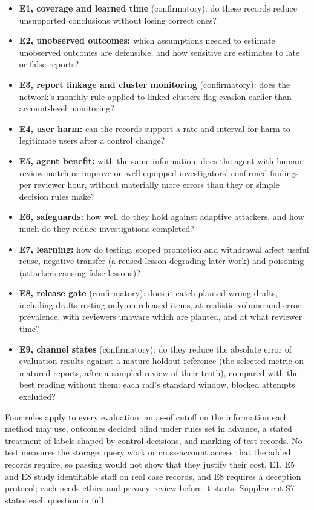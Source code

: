 \documentclass[acmlarge,review,anonymous,nonacm]{acmart}
\providecommand{\tightlist}{\setlength{\itemsep}{0pt}\setlength{\parskip}{0pt}}
\begin{document}
\begin{itemize}
\tightlist
\item
  \textbf{E1, coverage and learned time} (confirmatory): do these
  records reduce unsupported conclusions without losing correct ones?
\item
  \textbf{E2, unobserved outcomes:} which assumptions needed to estimate
  unobserved outcomes are defensible, and how sensitive are estimates to
  late or false reports?
\item
  \textbf{E3, report linkage and cluster monitoring} (confirmatory):
  does the network's monthly rule applied to linked clusters flag
  evasion earlier than account-level monitoring?
\item
  \textbf{E4, user harm:} can the records support a rate and interval
  for harm to legitimate users after a control change?
\item
  \textbf{E5, agent benefit:} with the same information, does the agent
  with human review match or improve on well-equipped investigators'
  confirmed findings per reviewer hour, without materially more errors
  than they or simple decision rules make?
\item
  \textbf{E6, safeguards:} how well do they hold against adaptive
  attackers, and how much do they reduce investigations completed?
\item
  \textbf{E7, learning:} how do testing, scoped promotion and withdrawal
  affect useful reuse, negative transfer (a reused lesson degrading
  later work) and poisoning (attackers causing false lessons)?
\item
  \textbf{E8, release gate} (confirmatory): does it catch planted wrong
  drafts, including drafts resting only on released items, at realistic
  volume and error prevalence, with reviewers unaware which are planted,
  and at what reviewer time?
\item
  \textbf{E9, channel states} (confirmatory): do they reduce the
  absolute error of evaluation results against a mature holdout
  reference (the selected metric on matured reports, after a sampled
  review of their truth), compared with the best reading without them:
  each rail's standard window, blocked attempts excluded?
\end{itemize}

Four rules apply to every evaluation: an as-of cutoff on the information
each method may use, outcomes decided blind under rules set in advance,
a stated treatment of labels shaped by control decisions, and marking of
test records. No test measures the storage, query work or cross-account
access that the added records require, so passing would not show that
they justify their cost. E1, E5 and E8 study identifiable staff on real
case records, and E8 requires a deception protocol; each needs ethics
and privacy review before it starts. Supplement S7 states each question
in full.
\end{document}
